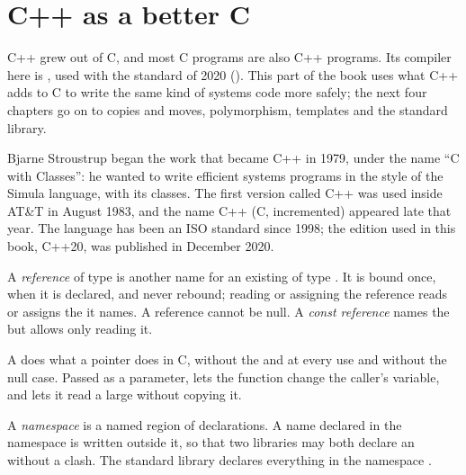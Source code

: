 \section{C++ as a better C}\label{sec:b2:cpp-classes-raii:better-c}

C++ grew out of C, and most C programs are also C++ programs. Its compiler here is , used with the
standard of 2020 (). This part of the book uses what C++ adds to C to write the same kind of
systems code more safely; the next four chapters go on to copies and moves, polymorphism, templates and the
standard library.

\begin{history}
Bjarne Stroustrup began the work that became C++ in 1979, under the name ``C with Classes'': he
wanted to write efficient systems programs in the style of the Simula language, with its classes. The first version called C++ was used inside
AT\&T in August 1983, and the name C++ (C, incremented) appeared late that year. The language has been an ISO
standard since 1998; the edition used in this book, C++20, was published in December 2020.
\end{history}

\begin{definition}[Reference]\label{def:b2:cpp-classes-raii:reference}
A \emph{reference} of type  is another name for an existing  of type
. It is bound once, when it is declared, and never rebound; reading or assigning the reference reads or
assigns the  it names. A reference cannot be null. A \emph{const reference}  names the 
but allows only reading it.
\end{definition}

A  does what a pointer does in C, without the \code{*} and \code{&} at every use and without the null
case. Passed as a parameter,  lets the function change the caller's variable, and  lets
it read a large  without copying it.

\begin{definition}[Namespace]\label{def:b2:cpp-classes-raii:namespace}
A \emph{namespace} is a named region of declarations. A name  declared in the namespace
 is written  outside it, so that two libraries may both declare an  without a clash.
The standard library declares everything in the namespace .
\end{definition}

